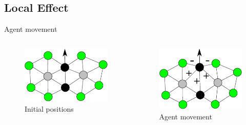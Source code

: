 \documentclass{beamer}
\begin{document}
\subsection{Local Effect}
\begin{frame}{Agent movement}
  \begin{columns}
      \begin{figure}
        \begin{center}
          \includegraphics[width=5cm]{InterAgentEffect1.pdf}
        \end{center}
        \caption{Initial positions}
      \end{figure}
        \begin{figure}
          \begin{center}
            \includegraphics[width=5cm]{InterAgentEffect2.pdf}
          \end{center}
          \caption{Agent movement}
        \end{figure}
    \end{columns}
\end{frame}
\end{document}
